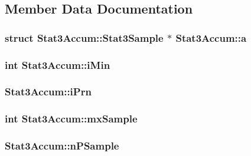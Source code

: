 \subsection{Member Data Documentation}
\hypertarget{struct_stat3_accum_ab4c3e63dea8ab19f10fd636e8062c108}{
\subsubsection[{a}]{\setlength{\rightskip}{0pt plus 5cm}struct {\bf Stat3\-Accum\-::\-Stat3\-Sample} $\ast$ Stat3\-Accum\-::a}}\label{struct_stat3_accum_ab4c3e63dea8ab19f10fd636e8062c108}
\hypertarget{struct_stat3_accum_a33a25df2bf3dae63cc1960d4e5586e1d}{
\subsubsection[{i\-Min}]{\setlength{\rightskip}{0pt plus 5cm}int Stat3\-Accum\-::i\-Min}}\label{struct_stat3_accum_a33a25df2bf3dae63cc1960d4e5586e1d}
\hypertarget{struct_stat3_accum_a44d4e5372a3656038d935b09e4d5d8de}{
\subsubsection[{i\-Prn}]{ Stat3\-Accum\-::i\-Prn}}\label{struct_stat3_accum_a44d4e5372a3656038d935b09e4d5d8de}
\hypertarget{struct_stat3_accum_a736d6f6da776d17f54a87e31a457f4bb}{
\subsubsection[{mx\-Sample}]{\setlength{\rightskip}{0pt plus 5cm}int Stat3\-Accum\-::mx\-Sample}}\label{struct_stat3_accum_a736d6f6da776d17f54a87e31a457f4bb}
\hypertarget{struct_stat3_accum_aaad385a6c7100fc8674f98bee196d78d}{
\subsubsection[{n\-P\-Sample}]{ Stat3\-Accum\-::n\-P\-Sample}}\label{struct_stat3_accum_aaad385a6c7100fc8674f98bee196d78d}
